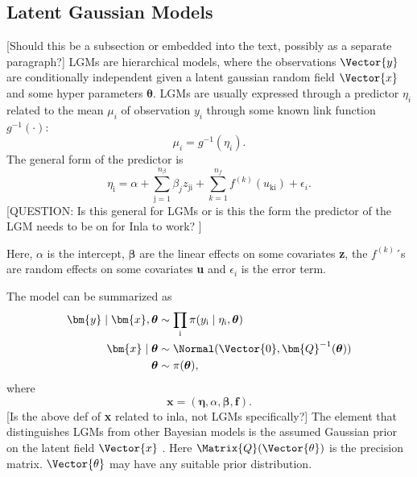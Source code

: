 \subsection{Latent Gaussian Models}
\label{sec:LGM}
[Should this be a subsection or embedded into the text, possibly as a separate paragraph?]
LGMs are hierarchical models, where the observations $\Vector{y}$ are conditionally independent given a latent gaussian random field $\Vector{x}$ and some hyper parameters $\boldsymbol{\theta}$.
LGMs are usually expressed through a predictor $\eta_i$ related to the mean $\mu_i$ of observation $y_i$ through some known link function $g^{-1}(\cdot)$:
\begin{equation}
    \mu_i = g^{-1}(\eta_i).
    \label{eq:LGMlinkFunction}
\end{equation}
The general form of the predictor is
\begin{equation}
    \eta_\text{i} = \alpha + \sum_{\text{j}=1}^{n_{\beta}}\beta_j z_{\text{ji}} + \sum_{k=1}^{n_f}f^{(k)}(u_{\text{ki}}) + \epsilon_{i}.
    \label{LGM-linear-predictor}
\end{equation}
\cite{rue2009inla}
[QUESTION: Is this general for LGMs or is this the form the predictor of the LGM needs to be on for Inla to work? ]

Here, $\alpha$ is the intercept, $\boldsymbol{\beta}$ are the linear effects on some covariates \textbf{z}, the $f^{(k)}$´s are random effects on some covariates \textbf{u} and $\epsilon_i$ is the error term. 

\noindent The model can be summarized as 
\begin{equation}
    \begin{aligned}
    \bm{y}\mid \bm{x}, \boldsymbol{\theta} &\sim \prod_{\text{i}} \pi (y_{\text{i}} \mid \eta_{\text{i}}, \boldsymbol{\theta})\\
    \bm{x} \mid \boldsymbol{\theta} &\sim \Normal(\Vector{0}, \bm{Q}^{-1}(\boldsymbol{\theta})) \\
    \boldsymbol{\theta} &\sim \pi(\boldsymbol{\theta}),
    \end{aligned}
    \label{LGM-model-summarized}
\end{equation}
where
\begin{equation}
    \bm{x} = (\boldsymbol{\eta}, \alpha, \boldsymbol{\beta}, \boldsymbol{f}).
    \label{LGM-latent-field}
\end{equation}
[Is the above def of \textbf{x} related to inla, not LGMs specifically?]
The element that distinguishes LGMs from other Bayesian models is the assumed Gaussian prior on the latent field $\Vector{x}$ \cite{rue2009inla}. Here $\Matrix{Q}(\Vector{\theta})$ is the precision matrix. $\Vector{\theta}$ may have any suitable prior distribution. 
